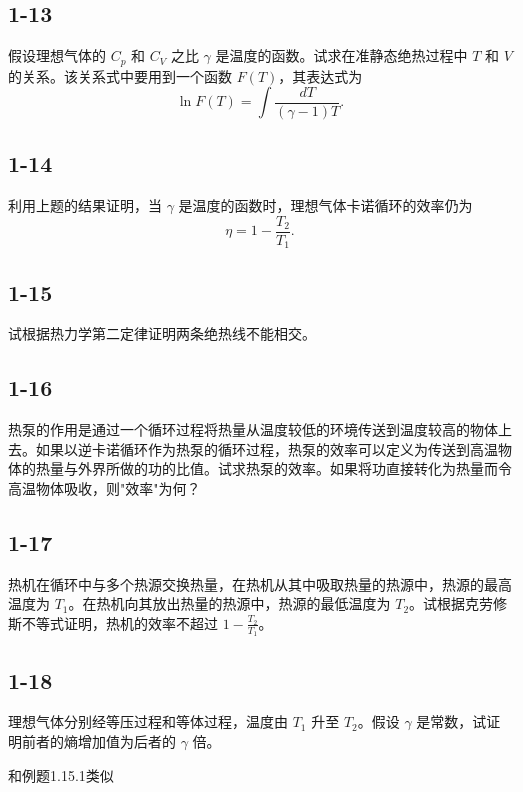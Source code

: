 \newpage
\subsection{1-13}
假设理想气体的 $C_p$ 和 $C_V$ 之比 $\gamma$ 是温度的函数。试求在准静态绝热过程中 $T$ 和 $V$ 的关系。该关系式中要用到一个函数 $F(T)$，其表达式为
$$\ln F(T) = \int \frac{dT}{(\gamma - 1)T}.$$

\newpage
\subsection{1-14}
利用上题的结果证明，当 $\gamma$ 是温度的函数时，理想气体卡诺循环的效率仍为
$$\eta = 1 - \frac{T_2}{T_1}.$$

\newpage
\subsection{1-15}
试根据热力学第二定律证明两条绝热线不能相交。

\newpage
\subsection{1-16}
热泵的作用是通过一个循环过程将热量从温度较低的环境传送到温度较高的物体上去。如果以逆卡诺循环作为热泵的循环过程，热泵的效率可以定义为传送到高温物体的热量与外界所做的功的比值。试求热泵的效率。如果将功直接转化为热量而令高温物体吸收，则"效率"为何？

\newpage
\subsection{1-17}
热机在循环中与多个热源交换热量，在热机从其中吸取热量的热源中，热源的最高温度为 $T_1$。在热机向其放出热量的热源中，热源的最低温度为 $T_2$。试根据克劳修斯不等式证明，热机的效率不超过 $1 - \frac{T_2}{T_1}$。

\newpage
\subsection{1-18}
理想气体分别经等压过程和等体过程，温度由 $T_1$ 升至 $T_2$。假设 $\gamma$ 是常数，试证明前者的熵增加值为后者的 $\gamma$ 倍。

和例题1.15.1类似

